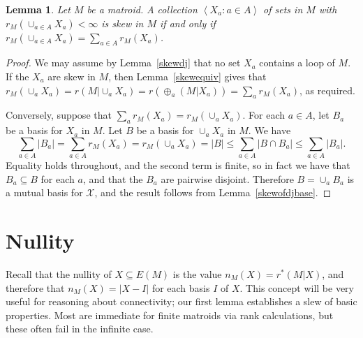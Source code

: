 \documentclass{amsart}
\theoremstyle{plain}
\newtheorem{lemma}[theorem]{Lemma}
\theoremstyle{definition}
\newcommand{\cX}{\mathcal{X}}
\newcommand{\br}[1]{\left(#1\right)}
\newcommand{\ab}[1]{\left\langle#1\right\rangle}
\renewcommand{\le}{\leqslant}
\renewcommand{\ss}{\subseteq}
\begin{document}
\begin{lemma}\label{skewrank}
  Let $M$ be a matroid. A collection $\ab{X_a : a \in A}$ of sets in $M$ with
  $r_M(\cup_{a \in A}X_a) < \infty$
  is skew in $M$ if and only if 
  $r_M(\cup_{a \in A} X_a) = \sum_{a \in A} r_M(X_a)$. 
\end{lemma}
\begin{proof}
  We may assume by Lemma~\ref{skewdj} that no set $X_a$ contains a loop of $M$. 
  If the $X_a$ are skew in $M$, then Lemma~\ref{skewequiv} gives that 
  $r_M(\cup_a X_a) = r(M | \cup_a X_a) = r\br{\oplus_a (M | X_a)} = \sum_a r_M(X_a)$, 
  as required. 

  Conversely, suppose that $\sum_a r_M(X_a) = r_M\br{\cup_a X_a}$. 
  For each $a \in A$, let $B_a$ be a basis for $X_a$ in $M$. Let $B$ be a basis 
  for $\cup_{a}X_a$ in $M$. We have 
  \[\sum_{a \in A} |B_a| = \sum_{a \in A} r_M(X_a) = r_M\br{\cup_a X_a} = |B| \le \sum_{a \in A} |B \cap B_a| \le \sum_{a \in A} |B_a|.\]
  Equality holds throughout, and the second term is finite, so in fact we have 
  that $B_a \ss B$ for each $a$, and that the $B_a$ are pairwise disjoint. 
  Therefore $B = \cup_a B_a$ is a mutual basis for $\cX$, and the result follows from Lemma~\ref{skewofdjbase}.
\end{proof}


\section{Nullity}\label{nullitysec}

Recall that the nullity of $X \ss E(M)$ is the value $n_M(X) = r^*(M|X)$, 
and therefore that $n_M(X) = |X - I|$ for each basis $I$ of $X$. 
This concept will be very useful for reasoning about connectivity; 
our first lemma establishes a slew of basic properties.
Most are immediate for finite matroids via rank calculations, 
but these often fail in the infinite case. 
\end{document}
